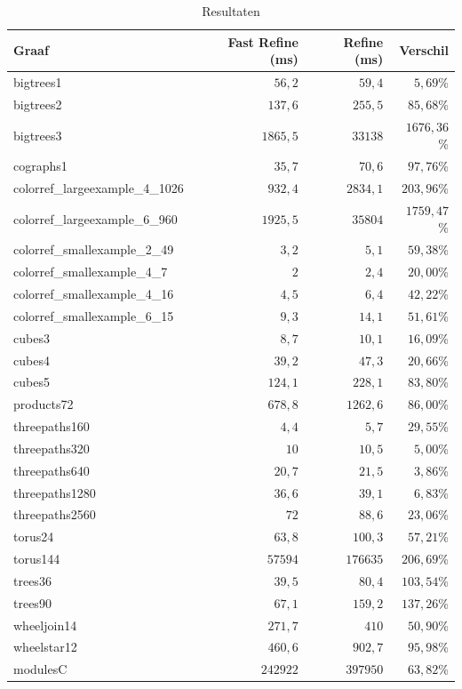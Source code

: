 \documentclass[twoside]{article}
\begin{document}
\begin{table}[H]
\caption{Resultaten}\label{table:resultaten}
\centering
\begin{tabular}{lrrr}
\toprule
Graaf & Fast Refine (ms) & Refine (ms) & Verschil \\
\midrule
\midrule
bigtrees1 & $56,2$ & $59,4$ & $5,69$\% \\
bigtrees2 & $137,6$ & $255,5$ & $85,68$\% \\
bigtrees3 & $1865,5$ & $33138$ & $1676,36$\% \\
cographs1 & $35,7$ & $70,6$ & $97,76$\% \\
colorref\_largeexample\_4\_1026 & $932,4$ & $2834,1$ & $203,96$\% \\
colorref\_largeexample\_6\_960 & $1925,5$ & $35804$ & $1759,47$\% \\
colorref\_smallexample\_2\_49 & $3,2$ & $5,1$ & $59,38$\% \\
colorref\_smallexample\_4\_7 & $2$ & $2,4$ & $20,00$\% \\
colorref\_smallexample\_4\_16 & $4,5$ & $6,4$ & $42,22$\% \\
colorref\_smallexample\_6\_15 & $9,3$ & $14,1$ & $51,61$\% \\
cubes3 & $8,7$ & $10,1$ & $16,09$\% \\
cubes4 & $39,2$ & $47,3$ & $20,66$\% \\
cubes5 & $124,1$ & $228,1$ & $83,80$\% \\
products72 & $678,8$ & $1262,6$ & $86,00$\% \\
threepaths160 & $4,4$ & $5,7$ & $29,55$\% \\
threepaths320 & $10$ & $10,5$ & $5,00$\% \\
threepaths640 & $20,7$ & $21,5$ & $3,86$\% \\
threepaths1280 & $36,6$ & $39,1$ & $6,83$\% \\
threepaths2560 & $72$ & $88,6$ & $23,06$\% \\
torus24 & $63,8$ & $100,3$ & $57,21$\% \\
torus144 & $57594$ & $176635$ & $206,69$\% \\
trees36 & $39,5$ & $80,4$ & $103,54$\% \\
trees90 & $67,1$ & $159,2$ & $137,26$\% \\
wheeljoin14 & $271,7$ & $410$ & $50,90$\% \\
wheelstar12 & $460,6$ & $902,7$ & $95,98$\% \\
modulesC & $242922$ & $397950$ & $63,82$\% \\

\bottomrule
\end{tabular}
\end{table}
\end{document}
